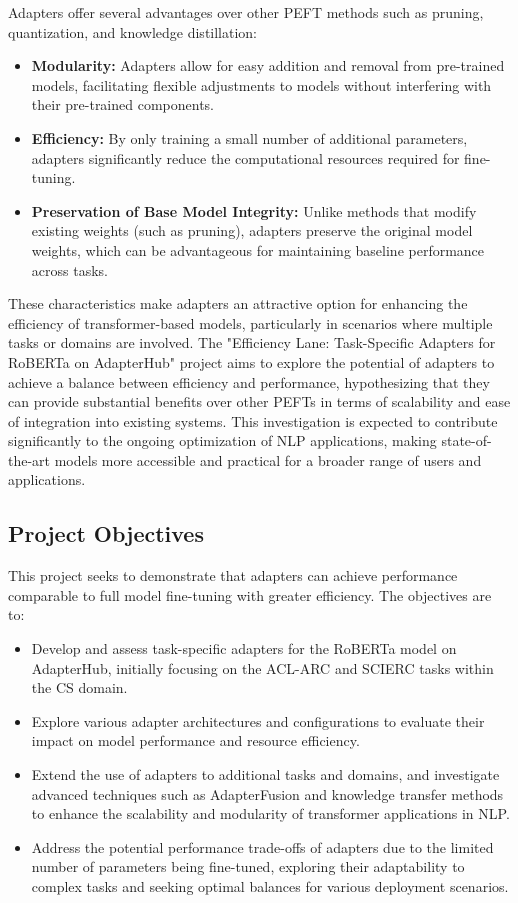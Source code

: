 \documentclass[12pt]{article}
\begin{document}
Adapters offer several advantages over other PEFT methods such as pruning, quantization, and knowledge distillation:
\begin{itemize}
    \item \textbf{Modularity:} Adapters allow for easy addition and removal from pre-trained models, facilitating flexible adjustments to models without interfering with their pre-trained components.
    \item \textbf{Efficiency:} By only training a small number of additional parameters, adapters significantly reduce the computational resources required for fine-tuning.
    \item \textbf{Preservation of Base Model Integrity:} Unlike methods that modify existing weights (such as pruning), adapters preserve the original model weights, which can be advantageous for maintaining baseline performance across tasks.
\end{itemize}

These characteristics make adapters an attractive option for enhancing the efficiency of transformer-based models, particularly in scenarios where multiple tasks or domains are involved. The "Efficiency Lane: Task-Specific Adapters for RoBERTa on AdapterHub" project aims to explore the potential of adapters to achieve a balance between efficiency and performance, hypothesizing that they can provide substantial benefits over other PEFTs in terms of scalability and ease of integration into existing systems. This investigation is expected to contribute significantly to the ongoing optimization of NLP applications, making state-of-the-art models more accessible and practical for a broader range of users and applications.


\subsection{Project Objectives}
This project seeks to demonstrate that adapters can achieve performance comparable to full model fine-tuning with greater efficiency. The objectives are to:
\begin{itemize}
    \item Develop and assess task-specific adapters for the RoBERTa model on AdapterHub, initially focusing on the ACL-ARC and SCIERC tasks within the CS domain.
    \item Explore various adapter architectures and configurations to evaluate their impact on model performance and resource efficiency.
    \item Extend the use of adapters to additional tasks and domains, and investigate advanced techniques such as AdapterFusion and knowledge transfer methods to enhance the scalability and modularity of transformer applications in NLP.
    \item Address the potential performance trade-offs of adapters due to the limited number of parameters being fine-tuned, exploring their adaptability to complex tasks and seeking optimal balances for various deployment scenarios.
\end{itemize}
\end{document}
